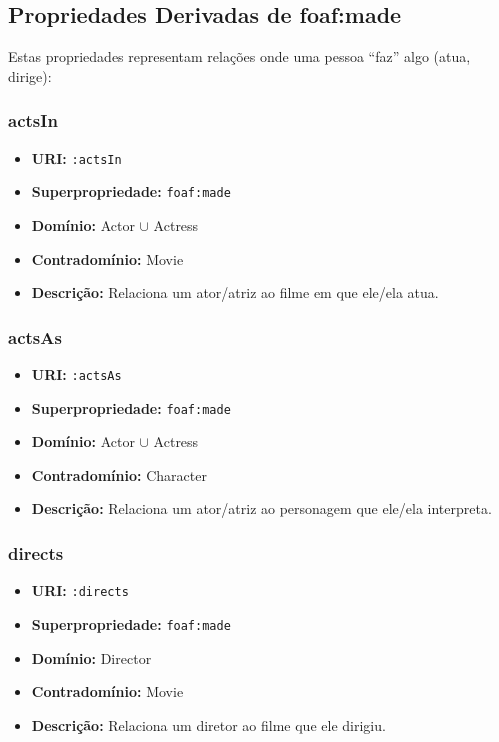 \documentclass[12pt,a4paper]{article}
\begin{document}
\subsection{Propriedades Derivadas de foaf:made}

Estas propriedades representam relações onde uma pessoa ``faz'' algo (atua, dirige):

\subsubsection{actsIn}
\begin{itemize}
    \item \textbf{URI:} \texttt{:actsIn}
    \item \textbf{Superpropriedade:} \texttt{foaf:made}
    \item \textbf{Domínio:} Actor $\cup$ Actress
    \item \textbf{Contradomínio:} Movie
    \item \textbf{Descrição:} Relaciona um ator/atriz ao filme em que ele/ela atua.
\end{itemize}

\subsubsection{actsAs}
\begin{itemize}
    \item \textbf{URI:} \texttt{:actsAs}
    \item \textbf{Superpropriedade:} \texttt{foaf:made}
    \item \textbf{Domínio:} Actor $\cup$ Actress
    \item \textbf{Contradomínio:} Character
    \item \textbf{Descrição:} Relaciona um ator/atriz ao personagem que ele/ela interpreta.
\end{itemize}

\subsubsection{directs}
\begin{itemize}
    \item \textbf{URI:} \texttt{:directs}
    \item \textbf{Superpropriedade:} \texttt{foaf:made}
    \item \textbf{Domínio:} Director
    \item \textbf{Contradomínio:} Movie
    \item \textbf{Descrição:} Relaciona um diretor ao filme que ele dirigiu.
\end{itemize}
\end{document}
